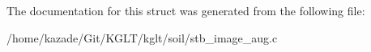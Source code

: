 The documentation for this struct was generated from the following file\-:\begin{DoxyCompactItemize}
\item 
/home/kazade/\-Git/\-K\-G\-L\-T/kglt/soil/stb\-\_\-image\-\_\-aug.\-c\end{DoxyCompactItemize}
